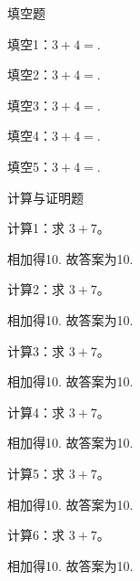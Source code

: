 \begin{makepart}{填空题}
\begin{problem}[2]
  填空1：$3+4=$.
\end{problem}
\begin{problem}[2]
  填空2：$3+4=$.
\end{problem}
\begin{problem}[2]
  填空3：$3+4=$.
\end{problem}
\begin{problem}[2]
  填空4：$3+4=$.
\end{problem}
\begin{problem}[2]
  填空5：$3+4=$.
\end{problem}
\end{makepart}

\begin{makepart}{计算与证明题}
\begin{problem}[10]
  计算1：求 $3+7$。
\begin{solution}
  相加得10.
  故答案为10.
\end{solution}
\end{problem}
\begin{problem}[10]
  计算2：求 $3+7$。
\begin{solution}
  相加得10.
  故答案为10.
\end{solution}
\end{problem}
\begin{problem}[10]
  计算3：求 $3+7$。
\begin{solution}
  相加得10.
  故答案为10.
\end{solution}
\end{problem}
\begin{problem}[10]
  计算4：求 $3+7$。
\begin{solution}
  相加得10.
  故答案为10.
\end{solution}
\end{problem}
\begin{problem}[10]
  计算5：求 $3+7$。
\begin{solution}
  相加得10.
  故答案为10.
\end{solution}
\end{problem}
\begin{problem}[10]
  计算6：求 $3+7$。
\begin{solution}
  相加得10.
  故答案为10.
\end{solution}
\end{problem}
\end{makepart}


